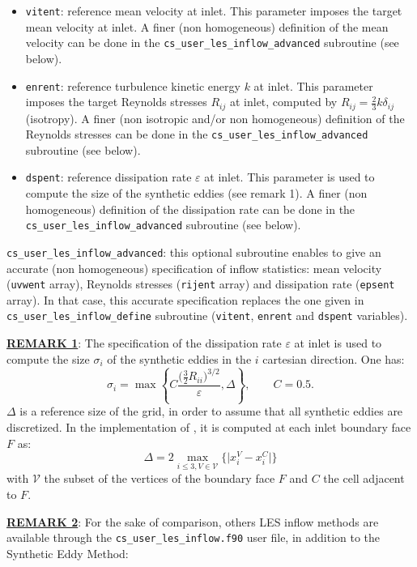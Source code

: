 {{{\begin{itemize}
\item \texttt{vitent}: reference mean velocity at inlet. This
  parameter imposes the target mean velocity at inlet. A finer (non
  homogeneous) definition of the mean velocity can be done in the
  \texttt{cs\_user\_les\_inflow\_advanced} subroutine (see below).

\item \texttt{enrent}: reference turbulence kinetic energy $k$ at
  inlet. This parameter imposes the target Reynolds stresses $R_{ij}$
  at inlet, computed by $R_{ij}=\frac{2}{3}k\delta_{ij}$ (isotropy). A
  finer (non isotropic and/or non homogeneous) definition of the
  Reynolds stresses can be done in the
  \texttt{cs\_user\_les\_inflow\_advanced} subroutine (see below).

\item \texttt{dspent}: reference dissipation rate $\varepsilon$ at
  inlet. This parameter is used to compute the size of the synthetic
  eddies (see remark 1). A finer (non homogeneous) definition of
  the dissipation rate can be done in the
  \texttt{cs\_user\_les\_inflow\_advanced} subroutine (see below).
\end{itemize}

\texttt{cs\_user\_les\_inflow\_advanced}: this optional subroutine
enables to give an accurate (non homogeneous) specification of inflow
statistics: mean velocity (\texttt{uvwent} array), Reynolds stresses
(\texttt{rijent} array) and dissipation rate (\texttt{epsent}
array). In that case, this accurate specification replaces the
one given in \texttt{cs\_user\_les\_inflow\_define} subroutine
(\texttt{vitent}, \texttt{enrent} and \texttt{dspent} variables).

{\bf \underline{REMARK 1}}: The specification of the dissipation rate
$\varepsilon$ at inlet is used to compute the size $\sigma_i$ of the
synthetic eddies in the $i$ cartesian direction. One has:
$$\sigma_i=\max\left\{C\frac{\big(\frac{3}{2}R_{ii}\big)^{3/2}}{\varepsilon},\Delta\right\},\qquad
C=0.5.$$
$\Delta$ is a reference size of the grid, in order to assume that all
synthetic eddies are discretized. In the implementation of \CS, it is
computed at each inlet boundary face $F$ as:
$$\Delta=2\max_{i\le3,V\in\mathcal{V}}\Big\{\big|x_i^V-x_i^C\big|\Big\}$$
with $\mathcal{V}$ the subset of the vertices of the boundary face $F$
and $C$ the cell adjacent to $F$.

{\bf \underline{REMARK 2}}: For the sake of comparison, others LES inflow methods are
available through the
\texttt{cs\_user\_les\_inflow.f90} user file, in addition to the
Synthetic Eddy Method:

}}}
